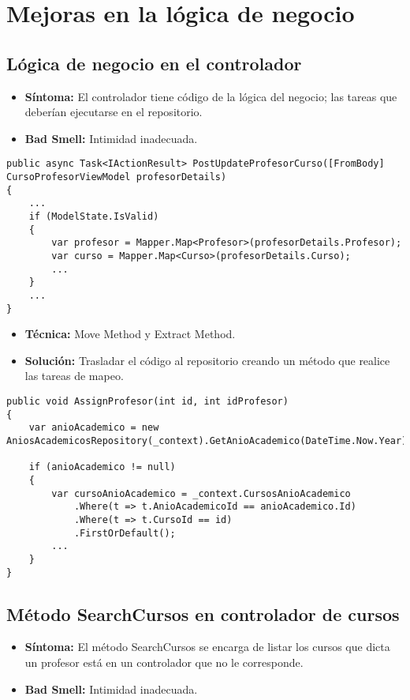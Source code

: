 \section{Mejoras en la lógica de negocio}


\subsection{Lógica de negocio en el controlador}
\begin{itemize}
	\item \textbf{Síntoma:} El controlador tiene código de la lógica del negocio; las tareas que deberían ejecutarse en el repositorio.
	\item \textbf{Bad Smell:} Intimidad inadecuada.
\end{itemize}

\begin{lstlisting}[language={[Sharp]C}]
public async Task<IActionResult> PostUpdateProfesorCurso([FromBody] CursoProfesorViewModel profesorDetails)
{
	...
	if (ModelState.IsValid)
	{
		var profesor = Mapper.Map<Profesor>(profesorDetails.Profesor);
		var curso = Mapper.Map<Curso>(profesorDetails.Curso);
		...
	}
	...
}
\end{lstlisting}

\begin{itemize}
	\item \textbf{Técnica:} Move Method y Extract Method.
	\item \textbf{Solución:} Trasladar el código al repositorio creando un método que realice las tareas de mapeo.
\end{itemize}

\begin{lstlisting}[language={[Sharp]C}]
public void AssignProfesor(int id, int idProfesor)
{
	var anioAcademico = new AniosAcademicosRepository(_context).GetAnioAcademico(DateTime.Now.Year);
	
	if (anioAcademico != null)
	{
		var cursoAnioAcademico = _context.CursosAnioAcademico
			.Where(t => t.AnioAcademicoId == anioAcademico.Id)
			.Where(t => t.CursoId == id)
			.FirstOrDefault();	
		...
	}
}
\end{lstlisting}


\subsection{Método SearchCursos en controlador de cursos}
\begin{itemize}
	\item \textbf{Síntoma:} El método SearchCursos se encarga de listar los cursos que dicta un profesor está en un controlador que no le corresponde.
	\item \textbf{Bad Smell:} Intimidad inadecuada.
\end{itemize}

